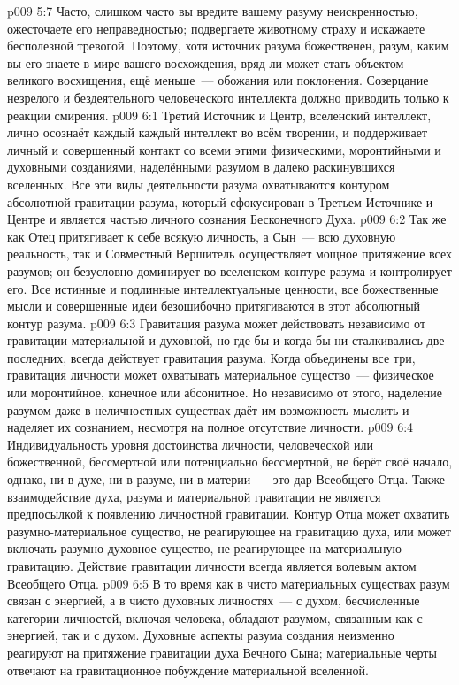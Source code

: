 \vs p009 5:7 Часто, слишком часто вы вредите вашему разуму неискренностью, ожесточаете его неправедностью; подвергаете животному страху и искажаете бесполезной тревогой. Поэтому, хотя источник разума божественен, разум, каким вы его знаете в мире вашего восхождения, вряд ли может стать объектом великого восхищения, ещё меньше~--- обожания или поклонения. Созерцание незрелого и бездеятельного человеческого интеллекта должно приводить только к реакции смирения.
\vs p009 6:1 Третий Источник и Центр, вселенский интеллект, лично осознаёт каждый  каждый интеллект во всём творении, и поддерживает личный и совершенный контакт со всеми этими физическими, моронтийными и духовными созданиями, наделёнными разумом в далеко раскинувшихся вселенных. Все эти виды деятельности разума охватываются контуром абсолютной гравитации разума, который сфокусирован в Третьем Источнике и Центре и является частью личного сознания Бесконечного Духа.
\vs p009 6:2 Так же как Отец притягивает к себе всякую личность, а Сын~--- всю духовную реальность, так и Совместный Вершитель осуществляет мощное притяжение всех разумов; он безусловно доминирует во вселенском контуре разума и контролирует его. Все истинные и подлинные интеллектуальные ценности, все божественные мысли и совершенные идеи безошибочно притягиваются в этот абсолютный контур разума.
\vs p009 6:3 \pc Гравитация разума может действовать независимо от гравитации материальной и духовной, но где бы и когда бы ни сталкивались две последних, всегда действует гравитация разума. Когда объединены все три, гравитация личности может охватывать материальное существо~--- физическое или моронтийное, конечное или абсонитное. Но независимо от этого, наделение разумом даже в неличностных существах даёт им возможность мыслить и наделяет их сознанием, несмотря на полное отсутствие личности.
\vs p009 6:4 \pc Индивидуальность уровня достоинства личности, человеческой или божественной, бессмертной или потенциально бессмертной, не берёт своё начало, однако, ни в духе, ни в разуме, ни в материи~--- это дар Всеобщего Отца. Также взаимодействие духа, разума и материальной гравитации не является предпосылкой к появлению личностной гравитации. Контур Отца может охватить разумно\hyp{}материальное существо, не реагирующее на гравитацию духа, или может включать разумно\hyp{}духовное существо, не реагирующее на материальную гравитацию. Действие гравитации личности всегда является волевым актом Всеобщего Отца.
\vs p009 6:5 В то время как в чисто материальных существах разум связан с энергией, а в чисто духовных личностях~--- с духом, бесчисленные категории личностей, включая человека, обладают разумом, связанным как с энергией, так и с духом. Духовные аспекты разума создания неизменно реагируют на притяжение гравитации духа Вечного Сына; материальные черты отвечают на гравитационное побуждение материальной вселенной.
